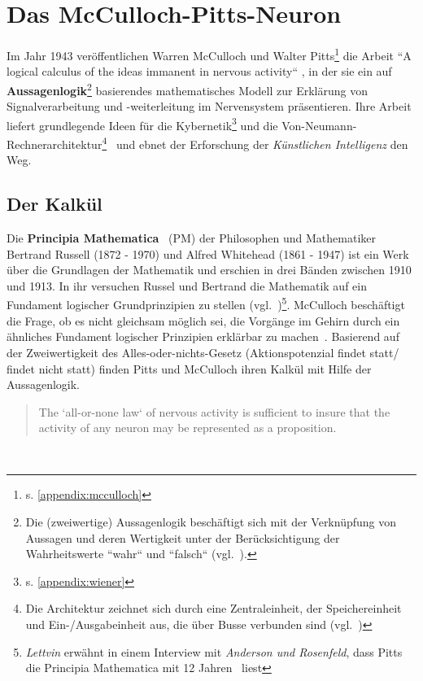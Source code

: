 \section{Das McCulloch-Pitts-Neuron}

Im Jahr 1943 veröffentlichen Warren McCulloch und Walter Pitts\footnote{
    s. \ref{appendix:mcculloch}
} die Arbeit ``A logical calculus of the ideas immanent in nervous activity`` \cite{MP43}, in der sie ein auf \textbf{Aussagenlogik}\footnote{
    Die (zweiwertige) Aussagenlogik beschäftigt sich mit der Verknüpfung von Aussagen und deren Wertigkeit unter der Berücksichtigung der Wahrheitswerte ``wahr`` und ``falsch`` (vgl.~\cite[2]{Rau88}).
} basierendes mathematisches Modell zur Erklärung von Signalverarbeitung und  -weiterleitung im Nervensystem präsentieren.
Ihre Arbeit liefert grundlegende Ideen für die Kybernetik\footnote{
    s. \ref{appendix:wiener}
} und die Von-Neumann-Rechnerarchitektur\footnote{
    Die Architektur zeichnet sich durch eine Zentraleinheit, der Speichereinheit und Ein-/Ausgabeinheit aus, die über Busse verbunden sind (vgl.~\cite[230]{OV00})
}~\cite[1]{Arb19} und ebnet der Erforschung der \textit{Künstlichen Intelligenz} den Weg.


\subsection{Der Kalkül}

Die \textbf{Principia Mathematica}~\cite{PW27} (PM) der Philosophen und Mathematiker Bertrand Russell (1872 - 1970) und Alfred Whitehead (1861 - 1947) ist ein Werk über die Grundlagen der Mathematik und erschien in drei Bänden zwischen 1910 und 1913. In ihr versuchen Russel und Bertrand die Mathematik auf ein Fundament logischer Grundprinzipien zu stellen (vgl.~\cite[225]{She26})\footnote{
    \textit{Lettvin} erwähnt in einem Interview mit \textit{Anderson und Rosenfeld}, dass Pitts die Principia Mathematica mit 12 Jahren~\cite[2]{AR98} liest
}.
McCulloch beschäftigt die Frage, ob es nicht gleichsam möglich sei, die Vorgänge im Gehirn durch ein ähnliches Fundament logischer Prinzipien erklärbar zu machen~\cite[4]{Arb19}. Basierend auf der Zweiwertigkeit des Alles-oder-nichts-Gesetz (Aktionspotenzial findet statt/ findet nicht statt) finden Pitts und McCulloch ihren Kalkül mit Hilfe der Aussagenlogik.\\

\blockquote[{\cite[100]{MP43}}]{
    The `all-or-none law` of nervous activity is sufficient to insure that the activity of any neuron may be represented as a proposition.
}\\

